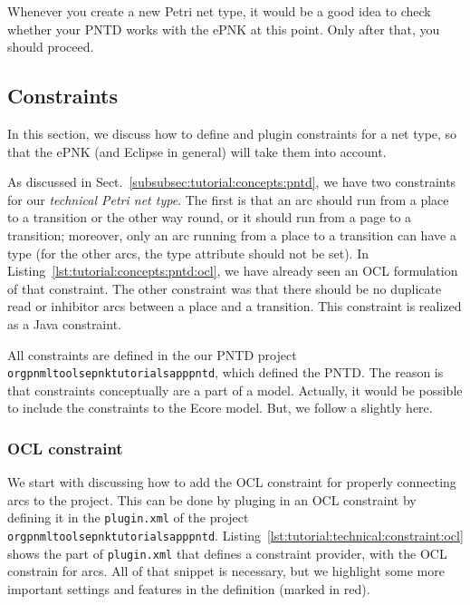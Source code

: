 Whenever you create a new Petri net type, it would be a good idea to check
whether your PNTD works with the ePNK at this point. Only after that, you should
proceed.

\subsection{Constraints}
\label{subsec:tutorial:technical:constraints}

In this section, we discuss how to define and plugin constraints for a
net type, so that the ePNK (and Eclipse in general) will take them into account.

As discussed in Sect.~\ref{subsubsec:tutorial:concepts:pntd}, we have two
constraints for our \emph{technical Petri net type}. The first is that an
arc should run from a place to a transition or the other way round, or it
should run from a page to a transition; moreover, only an arc running from 
a place to a transition can have a type (for the other arcs, the type attribute
should not be set). In Listing~\ref{lst:tutorial:concepts:pntd:ocl}, we have
already seen an OCL formulation of that constraint. The other constraint was
that there should be no duplicate read or inhibitor arcs between a place and
a transition. This constraint is realized as a Java constraint.

All constraints are defined in the our PNTD project {\tt
org\qnsep{}pnml\qnsep{}tools\qnsep{}epnk\qnsep{}tutorials\qnsep{}app\qnsep{}pntd},
which defined the PNTD. The reason
is that constraints conceptually are a part of a model. Actually, it would
be possible to include the constraints to the Ecore model. But, we follow
a slightly here.

\subsubsection{OCL constraint}
\label{subsubsec:tutorial:technical:constraints:ocl}

We start with discussing how to add the OCL constraint for properly connecting
arcs to the project. This can be done by pluging in an OCL constraint by
defining it in the {\tt plugin.xml} of the project
{\tt org\qnsep{}pnml\qnsep{}tools\qnsep{}epnk\qnsep{}tutorials\qnsep{}app\qnsep{}pntd}.
Listing~\ref{lst:tutorial:technical:constraint:ocl} shows the part of
{\tt plugin.xml} that defines a constraint provider, with the OCL
constrain for arcs. All of that snippet is necessary, but we highlight
some more important settings and features in the definition (marked in red).

